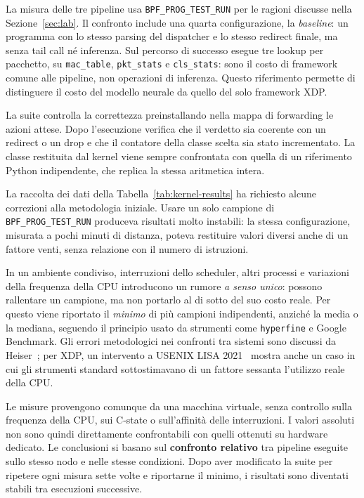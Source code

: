 \documentclass[binding=0.6cm,italian,oneside,noexaminfo]{sapthesis}
\begin{document}
La misura delle tre pipeline usa \texttt{BPF\_PROG\_TEST\_RUN} per le ragioni discusse nella Sezione~\ref{sec:lab}. Il confronto include una quarta configurazione, la \emph{baseline}: un programma con lo stesso parsing del dispatcher e lo stesso redirect finale, ma senza tail call né inferenza. Sul percorso di successo esegue tre lookup per pacchetto, su \texttt{mac\_table}, \texttt{pkt\_stats} e \texttt{cls\_stats}: sono il costo di framework comune alle pipeline, non operazioni di inferenza. Questo riferimento permette di distinguere il costo del modello neurale da quello del solo framework XDP.

La suite controlla la correttezza preinstallando nella mappa di forwarding le azioni attese. Dopo l'esecuzione verifica che il verdetto sia coerente con un redirect o un drop e che il contatore della classe scelta sia stato incrementato. La classe restituita dal kernel viene sempre confrontata con quella di un riferimento Python indipendente, che replica la stessa aritmetica intera.

La raccolta dei dati della Tabella~\ref{tab:kernel-results} ha richiesto alcune correzioni alla metodologia iniziale. Usare un solo campione di \texttt{BPF\_PROG\_TEST\_RUN} produceva risultati molto instabili: la stessa configurazione, misurata a pochi minuti di distanza, poteva restituire valori diversi anche di un fattore venti, senza relazione con il numero di istruzioni.

In un ambiente condiviso, interruzioni dello scheduler, altri processi e variazioni della frequenza della CPU introducono un rumore \emph{a senso unico}: possono rallentare un campione, ma non portarlo al di sotto del suo costo reale. Per questo viene riportato il \emph{minimo} di più campioni indipendenti, anziché la media o la mediana, seguendo il principio usato da strumenti come \texttt{hyperfine} e Google Benchmark. Gli errori metodologici nei confronti tra sistemi sono discussi da Heiser~\cite{heiser2018}; per XDP, un intervento a USENIX LISA 2021~\cite{lisa21} mostra anche un caso in cui gli strumenti standard sottostimavano di un fattore sessanta l'utilizzo reale della CPU.

Le misure provengono comunque da una macchina virtuale, senza controllo sulla frequenza della CPU, sui C-state o sull'affinità delle interruzioni. I valori assoluti non sono quindi direttamente confrontabili con quelli ottenuti su hardware dedicato. Le conclusioni si basano sul \textbf{confronto relativo} tra pipeline eseguite sullo stesso nodo e nelle stesse condizioni. Dopo aver modificato la suite per ripetere ogni misura sette volte e riportarne il minimo, i risultati sono diventati stabili tra esecuzioni successive.
\end{document}
